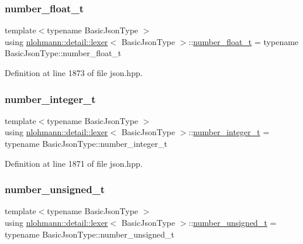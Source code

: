 \subsubsection{\texorpdfstring{number\+\_\+float\+\_\+t}{number\_float\_t}}
{\footnotesize\ttfamily template$<$typename Basic\+Json\+Type $>$ \\
using \hyperlink{classnlohmann_1_1detail_1_1lexer}{nlohmann\+::detail\+::lexer}$<$ Basic\+Json\+Type $>$\+::\hyperlink{classnlohmann_1_1detail_1_1lexer_aa7f9e7b2bcd311fb86e2da43761a6619}{number\+\_\+float\+\_\+t} =  typename Basic\+Json\+Type\+::number\+\_\+float\+\_\+t\hspace{0.3cm}{\ttfamily [private]}}



Definition at line 1873 of file json.\+hpp.

\mbox{\label{classnlohmann_1_1detail_1_1lexer_a9cd1b11cc67edbfb2613c788b5bd337c}} 
\subsubsection{\texorpdfstring{number\+\_\+integer\+\_\+t}{number\_integer\_t}}
{\footnotesize\ttfamily template$<$typename Basic\+Json\+Type $>$ \\
using \hyperlink{classnlohmann_1_1detail_1_1lexer}{nlohmann\+::detail\+::lexer}$<$ Basic\+Json\+Type $>$\+::\hyperlink{classnlohmann_1_1detail_1_1lexer_a9cd1b11cc67edbfb2613c788b5bd337c}{number\+\_\+integer\+\_\+t} =  typename Basic\+Json\+Type\+::number\+\_\+integer\+\_\+t\hspace{0.3cm}{\ttfamily [private]}}



Definition at line 1871 of file json.\+hpp.

\mbox{\label{classnlohmann_1_1detail_1_1lexer_a105d1dfeab414a572655895cdd96a52a}} 
\subsubsection{\texorpdfstring{number\+\_\+unsigned\+\_\+t}{number\_unsigned\_t}}
{\footnotesize\ttfamily template$<$typename Basic\+Json\+Type $>$ \\
using \hyperlink{classnlohmann_1_1detail_1_1lexer}{nlohmann\+::detail\+::lexer}$<$ Basic\+Json\+Type $>$\+::\hyperlink{classnlohmann_1_1detail_1_1lexer_a105d1dfeab414a572655895cdd96a52a}{number\+\_\+unsigned\+\_\+t} =  typename Basic\+Json\+Type\+::number\+\_\+unsigned\+\_\+t\hspace{0.3cm}{\ttfamily [private]}}



